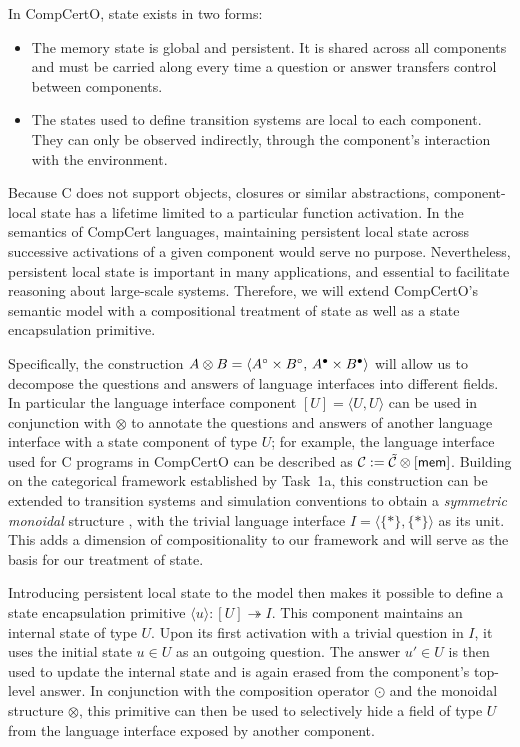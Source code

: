 In CompCertO, state exists in two forms:
\begin{itemize}
  \item The memory state is global and persistent.
    It is shared across all components
    and must be carried along
    every time a question or answer transfers control
    between components.
  \item The states used to define transition systems
    are local to each component.
    They can only be observed indirectly,
    through the component's interaction with the environment.
\end{itemize}
Because C does not support objects, closures or similar abstractions,
component-local state has a lifetime limited to a particular function activation.
In the semantics of CompCert languages,
maintaining persistent local state
across successive activations of a given component
would serve no purpose.
Nevertheless,
persistent local state is important in many applications,
and essential to facilitate reasoning about large-scale systems.
Therefore,
we will extend CompCertO's semantic model
with a compositional treatment of state
as well as a state encapsulation primitive.

Specifically, the construction
$A \otimes B = \langle A^\circ \times B^\circ, \, A^\bullet \times B^\bullet \rangle$
will allow us to decompose
the questions and answers of language interfaces
into different fields.
In particular the language interface component $[U] = \langle U,U \rangle$
can be used in conjunction with $\otimes$
to annotate the questions and answers of another language interface
with a state component of type $U$;
for example,
the language interface used for C programs in CompCertO
can be described as $\mathcal{C} := \tilde{\mathcal{C}} \otimes [ \mathsf{mem} ]$.
Building on the categorical framework established by Task~1a, 
this construction can be extended
to transition systems and simulation conventions
to obtain a \emph{symmetric monoidal} structure \cite{rosetta},
with the trivial language interface $I = \langle \{*\}, \{*\} \rangle$
as its unit.
This adds a dimension of compositionality to our framework
and will serve as the basis for our treatment of state.

Introducing persistent local state to the model
then makes it possible to define
a state encapsulation primitive $\langle u \rangle : [U] \twoheadrightarrow I$.
This component maintains an internal state of type $U$.
Upon its first activation with a trivial question in $I$,
it uses the initial state $u \in U$
as an outgoing question.
The answer $u' \in U$ is then used to update the internal state
and is again erased from the component's top-level answer.
In conjunction with
the composition operator $\odot$ and
the monoidal structure $\otimes$,
this primitive can then be used to selectively hide
a field of type $U$ from the language interface exposed
by another component.

